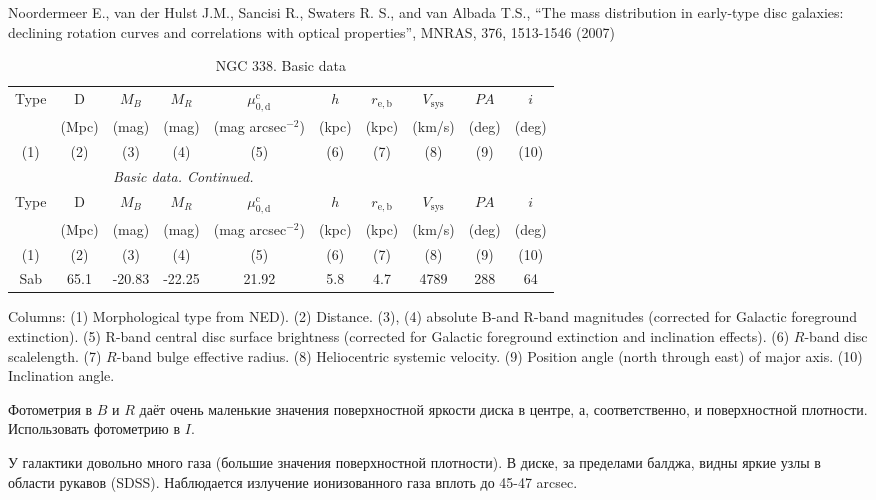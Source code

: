 \documentclass[english,10pt]{article}
\def\mm{\mathrm}
\begin{document}
\bigskip
\noindent
Noordermeer E., van der Hulst J.M., Sancisi R., 
Swaters R. S., and van Albada T.S., 
``The mass distribution in early-type disc galaxies: declining rotation
curves and correlations with optical properties'', 
MNRAS, 376, 1513-1546 (2007)

\begin{longtable}[c]{cccccccccc}
\caption{NGC 338. Basic data}\label{GAL}  \\ 
\hline 
Type & D & $M_B$ & $M_R$ & $\mu_\mm{0,d}^\mm{c}$ & $h$ & $r_\mm{e,b}$
& $V_\mm{sys}$ & $PA$ & $i$ \\ 
& (Mpc) & (mag) & (mag) & (mag arcsec$^{-2}$) & (kpc) & (kpc)
& (km/s) & (deg) & (deg) \\
(1)&(2)&(3)&(4)&(5)&(6)&(7)&(8)&(9)&(10) \\ 
\hline
\endfirsthead 
\hline
\multicolumn{6}{c}{\small\slshape Basic data. 
Continued. } \\ \hline
Type & D & $M_B$ & $M_R$ & $\mu_\mm{0,d}^\mm{c}$ & $h$ & $r_\mm{e,b}$
& $V_\mm{sys}$ & $PA$ & $i$ \\ 
& (Mpc) & (mag) & (mag) & (mag arcsec$^{-2}$) & (kpc) & (kpc)
& (km/s) & (deg) & (deg) \\
(1)&(2)&(3)&(4)&(5)&(6)&(7)&(8)&(9)&(10) \\ 
\hline
\endhead 
\hline
Sab & 65.1 & -20.83 & -22.25 & 21.92 & 5.8 & 4.7 
& 4789 & 288 & 64 \tabularnewline
\hline
\end{longtable}

Columns: 
(1) Morphological type from NED). 
(2) Distance. 
(3), (4) absolute B-and R-band magnitudes 
(corrected for Galactic foreground extinction).
(5) R-band central disc surface brightness 
(corrected for Galactic foreground extinction and inclination effects).
(6) $R$-band disc scalelength.
(7) $R$-band bulge effective radius.
(8) Heliocentric systemic velocity.
(9) Position angle (north through east) of major axis. 
(10) Inclination angle.

\bigskip
\noindent
Фотометрия в $B$ и $R$ даёт очень маленькие значения поверхностной 
яркости диска в центре, а, соответственно, и поверхностной плотности. 
Использовать фотометрию в $I$.

\bigskip
\noindent
У галактики довольно много газа (большие значения поверхностной 
плотности). В диске, за пределами балджа, видны яркие узлы в области 
рукавов (SDSS). Наблюдается излучение ионизованного газа вплоть до 
45-47 arcsec.
\end{document}
